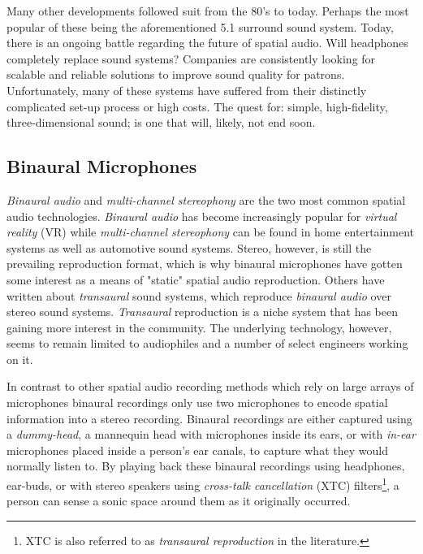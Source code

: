 Many other developments followed suit from the 80's to today. Perhaps the most popular of these being the aforementioned 5.1 surround sound system. Today, there is an ongoing battle regarding the future of spatial audio. Will headphones completely replace sound systems?  Companies are consistently looking for scalable and reliable solutions to improve sound quality for patrons. Unfortunately, many of these systems have suffered from their distinctly complicated set-up process or high costs. The quest for: simple, high-fidelity, three-dimensional sound; is one that will, likely, not end soon. 

\subsection{Binaural Microphones}

\textit{Binaural audio} and \textit{multi-channel stereophony} are the two most common spatial audio technologies. \textit{Binaural audio} has become increasingly popular for \textit{virtual reality} (VR) while \textit{multi-channel stereophony} can be found in home entertainment systems as well as automotive sound systems. Stereo, however, is still the prevailing reproduction format, which is why binaural microphones have gotten some interest as a means of "static" spatial audio reproduction. Others have written about \textit{transaural} sound systems, which reproduce \textit{binaural audio} over stereo sound systems. \textit{Transaural} reproduction is a niche system that has been gaining more interest in the community. The underlying technology, however, seems to remain limited to audiophiles and a number of select engineers working on it.

In contrast to other spatial audio recording methods which rely on large arrays of microphones binaural recordings only use two microphones to encode spatial information into a stereo recording. Binaural recordings are either captured using a \textit{dummy-head}, a mannequin head with microphones inside its ears, or with \textit{in-ear} microphones placed inside a person's ear canals, to capture what they would normally listen to. By playing back these binaural recordings using headphones, ear-buds, or with stereo speakers using \textit{cross-talk cancellation} (XTC) filters\footnote{XTC is also referred to as \textit{transaural reproduction} in the literature.}, a person can sense a sonic space around them as it originally occurred. 

